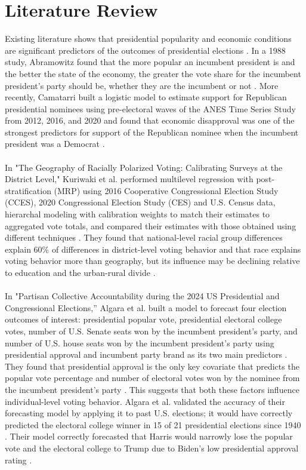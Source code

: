 \documentclass[letter]{article}
\begin{document}
\section{Literature Review}\label{sec:lit}
Existing literature shows that presidential popularity and economic conditions are significant predictors of the outcomes of presidential elections \cite{algara} \cite{camatarri} \cite{abramowitz}. In a 1988 study, Abramowitz found that the more popular an incumbent president is and the better the state of the economy, the greater the vote share for the incumbent president’s party should be, whether they are the incumbent or not \cite{abramowitz}. More recently, Camatarri built a logistic model to estimate support for Republican presidential nominees using pre-electoral waves of the ANES Time Series Study from 2012, 2016, and 2020 and found that economic disapproval was one of the strongest predictors for support of the Republican nominee when the incumbent president was a Democrat \cite{camatarri}. \\
\\
In "The Geography of Racially Polarized Voting: Calibrating Surveys at the District Level," Kuriwaki et al. performed multilevel regression with post-stratification (MRP) using 2016 Cooperative Congressional Election Study (CCES), 2020 Congressional Election Study (CES) and U.S. Census data, hierarchal modeling with calibration weights to match their estimates to aggregated vote totals, and compared their estimates with those obtained using different techniques \cite{kuriwaki}. They found that national-level racial group differences explain 60\% of differences in district-level voting behavior and that race explains voting behavior more than geography, but its influence may be declining relative to education and the urban-rural divide \cite{kuriwaki}. \\
\\
In "Partisan Collective Accountability during the 2024 US Presidential and Congressional Elections,” Algara et al. built a model to forecast four election outcomes of interest: presidential popular vote, presidential electoral college votes, number of U.S. Senate seats won by the incumbent president’s party, and number of U.S. house seats won by the incumbent president’s party using presidential approval and incumbent party brand as its two main predictors \cite{algara}. They found that presidential approval is the only key covariate that predicts the popular vote percentage and number of electoral votes won by the nominee from the incumbent president’s party \cite{algara}. This suggests that both these factors influence individual-level voting behavior. Algara et al. validated the accuracy of their forecasting model by applying it to past U.S. elections; it would have correctly predicted the electoral college winner in 15 of 21 presidential elections since 1940 \cite{algara}. Their model correctly forecasted that Harris would narrowly lose the popular vote and the electoral college to  Trump due to Biden's low presidential approval rating \cite{algara}. \\
\end{document}
